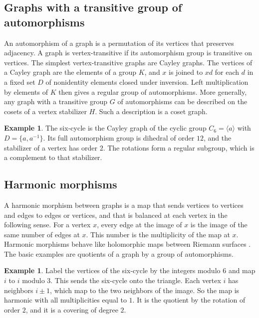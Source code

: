 \documentclass[12pt,letterpaper]{article}
\numberwithin{equation}{section}
\theoremstyle{definition}
\newtheorem{example}[theorem]{Example}
\begin{document}
\subsection*{Graphs with a transitive group of automorphisms}
An automorphism of a graph is a permutation of its vertices that preserves adjacency. A graph is vertex-transitive if its automorphism group is transitive on vertices. The simplest vertex-transitive graphs are Cayley graphs. The vertices of a Cayley graph are the elements of a group $K$, and $x$ is joined to $xd$ for each $d$ in a fixed set $D$ of nonidentity elements closed under inversion. Left multiplication by elements of $K$ then gives a regular group of automorphisms. More generally, any graph with a transitive group $G$ of automorphisms can be described on the cosets of a vertex stabilizer $H$. Such a description is a coset graph.
\begin{example}\label{ex:hexagon}
The six-cycle is the Cayley graph of the cyclic group $C_6=\langle a\rangle$ with $D=\{a,a^{-1}\}$. Its full automorphism group is dihedral of order $12$, and the stabilizer of a vertex has order $2$. The rotations form a regular subgroup, which is a complement to that stabilizer.
\end{example}

\subsection*{Harmonic morphisms}
A harmonic morphism between graphs is a map that sends vertices to vertices and edges to edges or vertices, and that is balanced at each vertex in the following sense. For a vertex $x$, every edge at the image of $x$ is the image of the same number of edges at $x$. This number is the multiplicity of the map at $x$. Harmonic morphisms behave like holomorphic maps between Riemann surfaces \cite{BN09}. The basic examples are quotients of a graph by a group of automorphisms.
\begin{example}\label{ex:antipodal}
Label the vertices of the six-cycle by the integers modulo $6$ and map $i$ to $i$ modulo $3$. This sends the six-cycle onto the triangle. Each vertex $i$ has neighbors $i\pm1$, which map to the two neighbors of the image. So the map is harmonic with all multiplicities equal to $1$. It is the quotient by the rotation of order $2$, and it is a covering of degree $2$.
\end{example}
\end{document}
